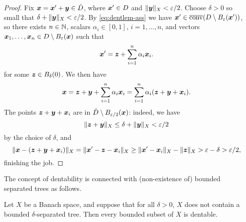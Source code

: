 \begin{proof}
  Fix $\bm{x} = \bm{x}' + \bm{y} \in \tilde{D}$, where $\bm{x}' \in D$ and $\|\bm{y}\|_{X} < \varepsilon/2$.
  Choose $\delta > 0$ so small that $\delta + \|\bm{y}\|_{X} < \varepsilon/2$.
  By \eqref{eq:dentlem-ass} we have $\bm{x}' \in \overline{\mathrm{conv}}(D \setminus B_{\varepsilon}(\bm{x}'))$, so there exists $n \in \mathbb{N}$, scalars $\alpha_i \in [0,1]$, $i = 1,\ldots,n$, and vectors $\bm{x}_1,\ldots,\bm{x}_n \in D \setminus B_{\varepsilon}(\bm{x})$ such that
  \begin{equation*}
    \bm{x}' = \bm{z} + \sum_{i=1}^{n} \alpha_i \bm{x}_{i}.
  \end{equation*}
  for some $\bm{z} \in B_{\delta}(0)$.
  We then have
  \begin{equation*}
    \bm{x} = \bm{z} + \bm{y} + \sum_{i=1}^{n} \alpha_i \bm{x}_{i} = \sum_{i=1}^{n}\alpha_i(\bm{z} + \bm{y} + \bm{x}_{i}).
  \end{equation*}
  The points $\bm{z} + \bm{y} + \bm{x}_{i}$ are in $\tilde{D} \setminus B_{\varepsilon/2}(\bm{x})$: indeed, we have
  \begin{equation*}
    \|\bm{z} + \bm{y}\|_{X} \leq \delta + \|\bm{y}\|_{X} < \varepsilon/2
  \end{equation*}
  by the choice of $\delta$, and
  \begin{equation*}
    \|\bm{x} - (\bm{z} + \bm{y} + \bm{x}_i) \|_{X}
    = \|\bm{x}' - \bm{z} - \bm{x}_i\|_{X}
    \geq \|\bm{x}' - \bm{x}_i\|_{X} - \|\bm{z}\|_{X}
    > \varepsilon - \delta > \varepsilon/2,
  \end{equation*}
  finishing the job.
\end{proof}

The concept of dentability is connected with (non-existence of) bounded separated trees as follows.

\begin{thm}
  Let $X$ be a Banach space, and suppose that for all $\delta > 0$, $X$ does not contain a bounded $\delta$-separated tree.
  Then every bounded subset of $X$ is dentable.
\end{thm}
  
